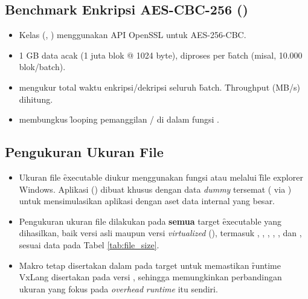 \subsection{Benchmark Enkripsi AES-CBC-256 ()}
\begin{itemize}
	\item {} Kelas  (, ) menggunakan API  OpenSSL untuk AES-256-CBC.
	\item {} 1 GB data acak (1 juta blok @ 1024 byte), diproses per \f{batch} (misal, 10.000 blok/batch).
	\item {}  mengukur total waktu enkripsi/dekripsi seluruh \f{batch}. \f{Throughput} (MB/s) dihitung.
	\item {}  membungkus \f{looping} pemanggilan / di dalam fungsi .
\end{itemize}

\subsection{Pengukuran Ukuran File}
\begin{itemize}
	\item {} Ukuran file \f{executable} diukur menggunakan fungsi  atau melalui \f{file explorer} Windows. Aplikasi  () dibuat khusus dengan data \textit{dummy} tersemat ( via ) untuk mensimulasikan aplikasi dengan aset data internal yang besar.
	\item {} Pengukuran ukuran file dilakukan pada \textbf{semua} target \f{executable} yang dihasilkan, baik versi asli maupun versi \textit{virtualized} (), termasuk , , , , , dan , sesuai data pada Tabel \ref{tab:file_size}.
	\item {} Makro  tetap disertakan dalam  pada target  untuk memastikan \f{runtime} VxLang disertakan pada versi , sehingga memungkinkan perbandingan ukuran yang fokus pada \textit{overhead} \textit{runtime} itu sendiri.
\end{itemize}


